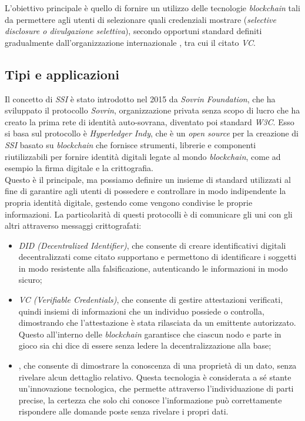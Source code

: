 L'obiettivo principale è quello di fornire un utilizzo delle tecnologie \textit{blockchain} tali da permettere agli utenti 
di selezionare quali credenziali mostrare (\textit{selective disclosure o divulgazione selettiva}),
secondo opportuni standard definiti gradualmente dall'organizzazione internazionale , tra cui il citato \textit{VC}.\@

\subsection{Tipi e applicazioni}\label{sec:self-sovereign-identity-tipi-applicazioni}

Il concetto di \textit{SSI} è stato introdotto nel 2015 da \textit{Sovrin Foundation}, che ha sviluppato il protocollo \textit{Sovrin},
organizzazione privata senza scopo di lucro che ha creato la prima rete di identità auto-sovrana, diventato poi standard \textit{W3C}. 
Esso si basa sul protocollo è \textit{Hyperledger Indy}, che è un  \textit{open source} per la creazione di \textit{SSI} basato su \textit{blockchain}
che fornisce strumenti, librerie e componenti riutilizzabili per fornire identità digitali legate al mondo \textit{blockchain}, 
come ad esempio la firma digitale e la crittografia. \\

Questo è il principale, ma possiamo definire un insieme di standard 
utilizzati al fine di garantire agli utenti di possedere e controllare in modo indipendente la propria identità digitale, gestendo come vengono
condivise le proprie informazioni. La particolarità di questi protocolli è di comunicare gli uni con gli altri attraverso messaggi crittografati:
\begin{itemize}
    \item \textit{DID (Decentralized Identifier)}, che consente di creare identificativi digitali decentralizzati come citato supportano
    e permettono di identificare i soggetti in modo resistente alla falsificazione, autenticando le informazioni in modo sicuro;
    \item \textit{VC (Verifiable Credentials)}, che consente di gestire attestazioni verificati, quindi insiemi di informazioni che un individuo
    possiede o controlla, dimostrando che l'attestazione è stata rilasciata da un emittente autorizzato. Questo all'interno delle \textit{blockchain}
    garantisce che ciascun nodo e parte in gioco sia chi dice di essere senza ledere la decentralizzazione alla base;
    \item {}, che consente di dimostrare la conoscenza di una proprietà di un dato, senza rivelare alcun dettaglio relativo.
    Questa tecnologia è considerata a sé stante un'innovazione tecnologica, che permette attraverso l'individuazione di parti precise,
    la certezza che solo chi conosce l'informazione può correttamente rispondere alle domande poste senza rivelare i propri dati.
\end{itemize}

